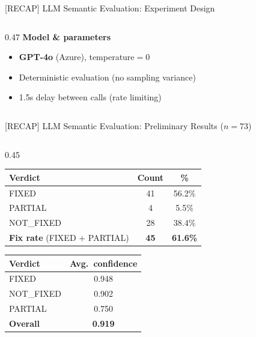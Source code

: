 \documentclass[aspectratio=169,10pt]{beamer}
\begin{document}
\begin{frame}{[RECAP] LLM Semantic Evaluation: Experiment Design}
\begin{columns}[T]
\begin{column}{0.47\textwidth}
  \vspace{0.5em}
  \textbf{Model \& parameters}
  {\scriptsize
  \begin{itemize}\setlength{\itemsep}{2pt}
    \item \textbf{GPT-4o} (Azure), temperature$=$0
    \item Deterministic evaluation (no sampling variance)
    \item 1.5s delay between calls (rate limiting)
  \end{itemize}}

\end{column}
\end{columns}
\end{frame}


\begin{frame}{[RECAP] LLM Semantic Evaluation: Preliminary Results ($n{=}73$)}

  \begin{columns}[T]
  \begin{column}{0.45\textwidth}

  \centering
  \vspace{0.5em}
  {\small
  \renewcommand{\arraystretch}{1.35}
  \setlength{\tabcolsep}{5pt}
  \begin{tabular}{l c c}
    \toprule
    \textbf{Verdict} & \textbf{Count} & \textbf{\%} \\
    \midrule
    \rowcolor{hit!12}
    FIXED       & 41 & 56.2\% \\
    \rowcolor{warn!12}
    PARTIAL     &  4 &  5.5\% \\
    \rowcolor{miss!12}
    NOT\_FIXED  & 28 & 38.4\% \\
    \midrule
    \rowcolor{c1!8}
    \textbf{Fix rate} (FIXED $+$ PARTIAL) & \textbf{45} & \textbf{61.6\%} \\
    \bottomrule
  \end{tabular}}

  \vspace{0.8em}
  {\scriptsize
  \renewcommand{\arraystretch}{1.25}
  \begin{tabular}{l c}
    \toprule
    \textbf{Verdict} & \textbf{Avg.\ confidence} \\
    \midrule
    FIXED       & 0.948 \\
    NOT\_FIXED  & 0.902 \\
    PARTIAL     & 0.750 \\
    \midrule
    \textbf{Overall} & \textbf{0.919} \\
    \bottomrule
  \end{tabular}}


\end{column}
\end{columns}
\end{frame}
\end{document}
